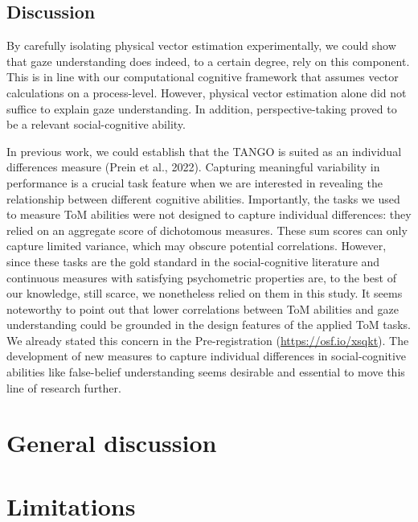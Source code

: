 \documentclass[
  man,floatsintext]{apa6}
\begin{document}
\hypertarget{discussion-2}{%
\subsection{Discussion}\label{discussion-2}}

By carefully isolating physical vector estimation experimentally, we could show that gaze understanding does indeed, to a certain degree, rely on this component.
This is in line with our computational cognitive framework that assumes vector calculations on a process-level.
However, physical vector estimation alone did not suffice to explain gaze understanding.
In addition, perspective-taking proved to be a relevant social-cognitive ability.

In previous work, we could establish that the TANGO is suited as an individual differences measure (Prein et al., 2022).
Capturing meaningful variability in performance is a crucial task feature when we are interested in revealing the relationship between different cognitive abilities.
Importantly, the tasks we used to measure ToM abilities were not designed to capture individual differences: they relied on an aggregate score of dichotomous measures.
These sum scores can only capture limited variance, which may obscure potential correlations.
However, since these tasks are the gold standard in the social-cognitive literature and continuous measures with satisfying psychometric properties are, to the best of our knowledge, still scarce, we nonetheless relied on them in this study.
It seems noteworthy to point out that lower correlations between ToM abilities and gaze understanding could be grounded in the design features of the applied ToM tasks.
We already stated this concern in the Pre-registration (\url{https://osf.io/xsqkt}).
The development of new measures to capture individual differences in social-cognitive abilities like false-belief understanding seems desirable and essential to move this line of research further.

\hypertarget{general-discussion}{%
\section{General discussion}\label{general-discussion}}

\hypertarget{limitations}{%
\section{Limitations}\label{limitations}}
\end{document}
